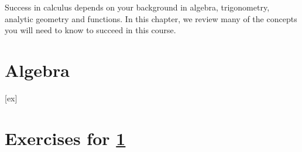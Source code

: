 Success in calculus depends on your background in algebra, trigonometry, 
analytic geometry and functions. In this chapter, we review many of the
concepts you will need to know to succeed in this course.

\section{Algebra}\label{sec:Algebra}










[ex]
\section*{Exercises for \ref{sec:Algebra}}

